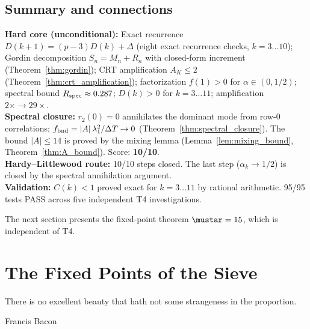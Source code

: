 \documentclass[12pt,a4paper]{article}
\begin{document}
\subsection{Summary and connections}
\label{sec:ch7_summary}

\begin{ledgerbox}
\textbf{Hard core (unconditional):} Exact recurrence $D(k+1) = (p-3)D(k) + \Delta$
  (eight exact recurrence checks, $k = 3\ldots 10$);
  Gordin decomposition $S_n = M_n + R_n$ with closed-form increment
  (Theorem~\ref{thm:gordin}); CRT amplification $A_K \leq 2$
  (Theorem~\ref{thm:crt_amplification});
  factorization $f(1) > 0$ for $\alpha \in (0,1/2)$;
  spectral bound $R_{\rm spec} \approx 0.287$;
  $D(k) > 0$ for $k = 3\ldots 11$; amplification $2\times \to 29\times$.\\[4pt]
\textbf{Spectral closure:} $r_2(0) = 0$ annihilates the dominant mode from
  row-$0$ correlations; $f_{\rm bnd} = |A|\,\lambda_1^2/\Delta T \to 0$
  (Theorem~\ref{thm:spectral_closure}). The bound $|A| \leq 14$ is proved
  by the mixing lemma (Lemma~\ref{lem:mixing_bound},
  Theorem~\ref{thm:A_bound}). Score: \textbf{10/10}.\\[4pt]
\textbf{Hardy--Littlewood route:} 10/10 steps closed. The last step
  ($\alpha_k \to 1/2$) is closed by the spectral annihilation
  argument.\\[4pt]
\textbf{Validation:} $C(k) < 1$ proved exact for $k = 3\ldots 11$ by
  rational arithmetic. 95/95 tests PASS across five independent T4
  investigations.
\end{ledgerbox}

\medskip
The next section presents the fixed-point theorem $\mustar = 15$,
which is independent of T4.


\newpage


\section{The Fixed Points of the Sieve}
\label{sec:fixed_point}

\epigraph{There is no excellent beauty that hath not some strangeness
in the proportion.}{Francis Bacon}
\end{document}
